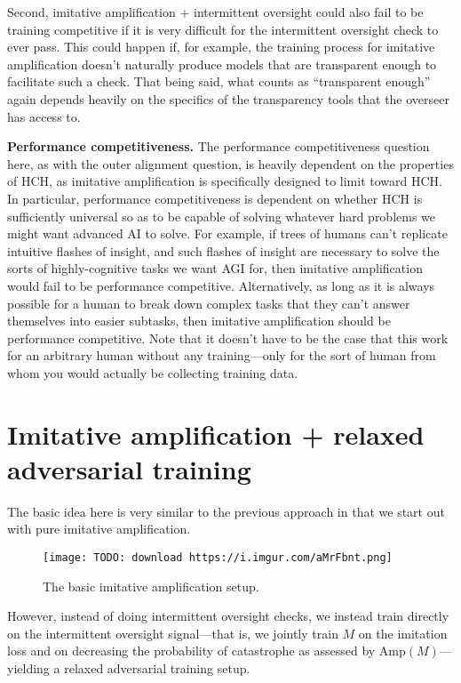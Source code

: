 Second, imitative amplification + intermittent oversight could also fail to be training competitive if it is very difficult for the intermittent oversight check to ever pass. This could happen if, for example, the training process for imitative amplification doesn't naturally produce models that are transparent enough to facilitate such a check. That being said, what counts as ``transparent enough'' again depends heavily on the specifics of the transparency tools that the overseer has access to.

\textbf{Performance competitiveness.} The performance competitiveness question here, as with the outer alignment question, is heavily dependent on the properties of HCH, as imitative amplification is specifically designed to limit toward HCH. In particular, performance competitiveness is dependent on whether HCH is sufficiently universal so as to be capable of solving whatever hard problems we might want advanced AI to solve. For example, if trees of humans can't replicate intuitive flashes of insight, and such flashes of insight are necessary to solve the sorts of highly-cognitive tasks we want AGI for, then imitative amplification would fail to be performance competitive. Alternatively, as long as it is always possible for a human to break down complex tasks that they can't answer themselves into easier subtasks, then imitative amplification should be performance competitive. Note that it doesn't have to be the case that this work for an arbitrary human without any training---only for the sort of human from whom you would actually be collecting training data.

\section{Imitative amplification + relaxed adversarial training}
\label{sec:3}

The basic idea here is very similar to the previous approach in that we start out with pure imitative amplification.

\begin{figure}[h!]
  \centering
  \texttt{[image: TODO: download https://i.imgur.com/aMrFbnt.png]}
  \caption{The basic imitative amplification setup.}
\end{figure}

However, instead of doing intermittent oversight checks, we instead train directly on the intermittent oversight signal---that is, we jointly train $M$ on the imitation loss and on decreasing the probability of catastrophe as assessed by $\text{Amp}(M)$---yielding a relaxed adversarial training setup\cite{TODO: cite https://www.alignmentforum.org/posts/9Dy5YRaoCxH9zuJqa/relaxed-adversarial-training-for-inner-alignment}.

